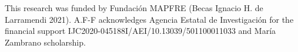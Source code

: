 \documentclass[Afour,sageh,times]{sagej}
\begin{document}
%

\begin{acks}
This research was funded by Fundaci\'on MAPFRE (Becas Ignacio H. de Larramendi 2021). A.F-F acknowledges Agencia Estatal de Investigaci\'on for the financial support IJC2020-045188I/AEI/10.13039/501100011033 and Mar\'ia Zambrano scholarship.
\end{acks}




\end{document}
